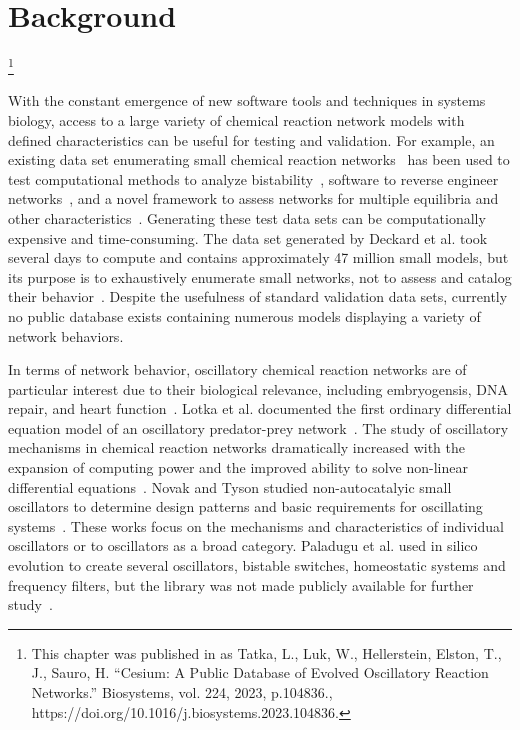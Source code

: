\documentclass[12pt]{report}
\newcommand\blfootnote[1]{%
  \begingroup
  \renewcommand\thefootnote{}\footnote{#1}%
  \addtocounter{footnote}{-1}%
  \endgroup
}
\begin{document}
\section{Background}
\blfootnote{This chapter was published in as
Tatka, L., Luk, W., Hellerstein, Elston, T., J., Sauro, H. “Cesium: A Public Database of Evolved Oscillatory Reaction Networks.”  Biosystems, vol. 224, 2023, p.104836., \\
https://doi.org/10.1016/j.biosystems.2023.104836. } With the constant emergence of new software tools and techniques in systems biology, access to a large variety of chemical reaction network models with defined characteristics can be useful for testing and validation. For example, an existing data set enumerating small chemical reaction networks~\cite{deckard2009} has been used to test computational methods to analyze bistability~\cite{pantea2010}, software to reverse engineer networks~\cite{nobile2013}, and a novel framework to assess networks for multiple equilibria and other characteristics~\cite{donnell2014}. Generating these test data sets can be computationally expensive and time-consuming. The data set generated by Deckard et al. took several days to compute and contains approximately 47 million small models, but its purpose is to exhaustively enumerate small networks, not to assess and catalog their behavior~\cite{deckard2009}.  Despite the usefulness of standard validation data sets, currently no public database exists containing numerous models displaying a variety of network behaviors.

In terms of network behavior, oscillatory chemical reaction networks are of particular interest due to their biological relevance, including embryogensis, DNA repair, and heart function~\cite{Novak2008,Aulehla2008,GevaZatorsky2006, Pol1928}. Lotka et al. documented the first ordinary differential equation model of an oscillatory predator-prey network~\cite{Lotka1910}. The study of oscillatory mechanisms in chemical reaction networks dramatically increased with the expansion of computing power and the improved ability to solve non-linear differential equations~\cite{Higgins1967}. Novak and Tyson studied non-autocatalyic small oscillators to determine design patterns and basic requirements for oscillating systems~\cite{Novak2008}. These works focus on the mechanisms and characteristics of individual oscillators or to oscillators as a broad category. Paladugu et al. used in silico evolution to create several oscillators, bistable switches, homeostatic systems and frequency filters, but the library was not made publicly available for further study~\cite{Paladugu2006}. 
\end{document}
